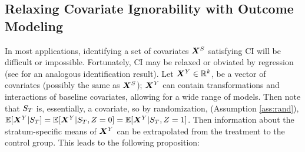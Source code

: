 \documentclass{statsoc} %
\begin{document}
\subsection{Relaxing Covariate Ignorability with Outcome Modeling}\label{sec:regression}
In most applications, identifying a set of covariates $\bm{X}^S$ satisfying CI will be difficult or impossible.
Fortunately, CI may be relaxed or obviated by regression (see \citealt[][\S 3.4]{jiangDing2021} for an analogous identification result).
Let $\bm{X}^Y\in \mathbb{R}^k$, be a vector of covariates (possibly the same as $\bm{X}^S$); $\bm{X}^Y$ can contain transformations and interactions of baseline covariates, allowing for a wide range of models.
Then note that $S_T$ is, essentially, a covariate, so by randomization, (Assumption \ref{ass:rand}), $\mathbb{E}[\bm{X}^Y|S_T]=\mathbb{E}[\bm{X}^Y|S_T,Z=0]=\mathbb{E}[\bm{X}^Y|S_T,Z=1]$.
Then information about the stratum-specific means of $\bm{X}^Y$ can be extrapolated from the treatment to the control group.
This leads to the following proposition:
\end{document}

